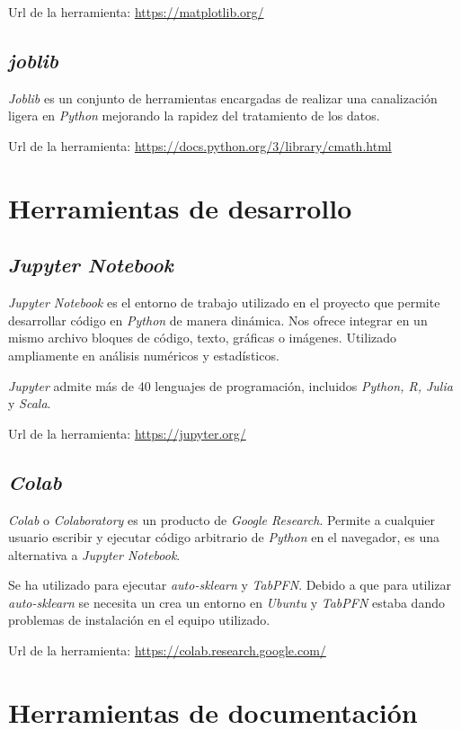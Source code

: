 Url de la herramienta: \url{https://matplotlib.org/}

\subsection{\textit{joblib}}

\textit{Joblib} es un conjunto de herramientas encargadas de realizar una canalización ligera en \textit{Python} mejorando la rapidez del tratamiento de los datos.

Url de la herramienta: \url{https://docs.python.org/3/library/cmath.html}

\section{Herramientas de desarrollo}
\subsection{\textit{Jupyter Notebook}}
\textit{Jupyter Notebook} es el entorno de trabajo utilizado en el proyecto que permite desarrollar código en \textit{Python} de manera dinámica. Nos ofrece integrar en un mismo archivo bloques de código, texto, gráficas o imágenes. Utilizado ampliamente en análisis numéricos y estadísticos.

\textit{Jupyter} admite más de 40 lenguajes de programación, incluidos \textit{Python, R, Julia} y \textit{Scala}.

Url de la herramienta: \url{https://jupyter.org/}

\subsection{\textit{Colab}}
\textit{Colab} o \textit{Colaboratory} es un producto de \textit{Google Research}. Permite a cualquier usuario escribir y ejecutar código arbitrario de \textit{Python} en el navegador, es una alternativa a \textit{Jupyter Notebook}.

Se ha utilizado para ejecutar \textit{auto-sklearn} y \textit{TabPFN}. Debido a que para utilizar \textit{auto-sklearn} se necesita un crea un entorno en \textit{Ubuntu} y \textit{TabPFN} estaba dando problemas de instalación en el equipo utilizado.

Url de la herramienta: \url{https://colab.research.google.com/}

\section{Herramientas de documentación}
